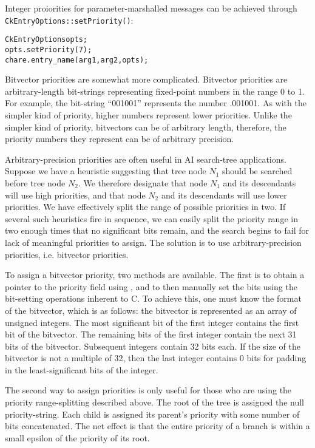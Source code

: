 Integer proiorities for parameter-marshalled messages can be achieved
through {\tt CkEntryOptions::setPriority()}:

\begin{alltt}
  CkEntryOptions opts;
  opts.setPriority(7);
  chare.entry_name(arg1, arg2, opts);
\end{alltt}

Bitvector priorities are somewhat more complicated.  Bitvector
priorities are arbitrary-length bit-strings representing fixed-point
numbers in the range 0 to 1.  For example, the bit-string ``001001''
represents the number .001001\raisebox{-.5ex}{\scriptsize binary}.  As
with the simpler kind of priority, higher numbers represent lower
priorities.  Unlike the simpler kind of priority, bitvectors can be of
arbitrary length, therefore, the priority numbers they represent can
be of arbitrary precision.

Arbitrary-precision priorities
are often useful in AI search-tree applications.  Suppose we have a
heuristic suggesting that tree node $N_1$ should be searched before
tree node $N_2$.  We therefore designate that node $N_1$ and its
descendants will use high priorities, and that node $N_2$ and its
descendants will use lower priorities.  We have effectively split the
range of possible priorities in two.  If several such heuristics fire
in sequence, we can easily split the priority range  in two enough times that no significant bits remain,
and the search begins to fail for lack of meaningful priorities to
assign.  The solution is to use arbitrary-precision priorities,
i.e. bitvector priorities.

To assign a bitvector priority, two methods are available.  The
first is to obtain a pointer to the priority field using  ,
and to then manually set the bits using the bit-setting operations
inherent to C.  To achieve this, one must know the format
 of the
bitvector, which is as follows: the bitvector is represented as an
array of unsigned integers.  The most significant bit of the first
integer contains the first bit of the bitvector.  The remaining bits
of the first integer contain the next 31 bits of the bitvector.
Subsequent integers contain 32 bits each.  If the size of the
bitvector is not a multiple of 32, then the last integer contains 0
bits for padding in the least-significant bits of the integer.

The second way to assign priorities is only useful for those who are
using the priority range-splitting
described above.  The root of the tree is assigned the null
priority-string.  Each child is assigned its parent's priority with
some number of bits concatenated.  The net effect is that the entire
priority of a branch is within a small epsilon of the priority of its
root.

